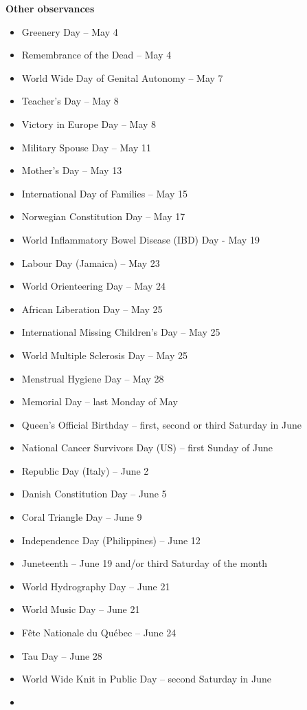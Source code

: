 \documentclass[
  openany]{book}
\begin{document}
\textbf{Other observances}

\begin{itemize}
\item
  Greenery Day -- May 4
\item
  Remembrance of the Dead -- May 4
\item
  World Wide Day of Genital Autonomy -- May 7
\item
  Teacher's Day -- May 8
\item
  Victory in Europe Day -- May 8
\item
  Military Spouse Day -- May 11
\item
  Mother's Day -- May 13
\item
  International Day of Families -- May 15
\item
  Norwegian Constitution Day -- May 17
\item
  World Inflammatory Bowel Disease (IBD) Day - May 19
\item
  Labour Day (Jamaica) -- May 23
\item
  World Orienteering Day -- May 24
\item
  African Liberation Day -- May 25
\item
  International Missing Children's Day -- May 25
\item
  World Multiple Sclerosis Day -- May 25
\item
  Menstrual Hygiene Day -- May 28
\item
  Memorial Day -- last Monday of May
\item
  Queen's Official Birthday -- first, second or third Saturday in June
\item
  National Cancer Survivors Day (US) -- first Sunday of June
\item
  Republic Day (Italy) -- June 2
\item
  Danish Constitution Day -- June 5
\item
  Coral Triangle Day -- June 9
\item
  Independence Day (Philippines) -- June 12
\item
  Juneteenth -- June 19 and/or third Saturday of the month
\item
  World Hydrography Day -- June 21
\item
  World Music Day -- June 21
\item
  Fête Nationale du Québec -- June 24
\item
  Tau Day -- June 28
\item
  World Wide Knit in Public Day -- second Saturday in June
\item

\end{itemize}
\end{document}
